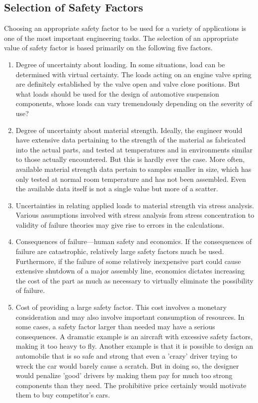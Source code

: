 \documentclass[a4paper,openany,12pt]{book}
\begin{document}
\subsection{Selection of Safety Factors}
\label{sec:org35afc56}
Choosing an appropriate safety factor to be used for a variety of
applications is one of the most important engineering tasks. The
selection of an appropriate value of safety factor is based primarily on
the following five factors.

\begin{enumerate}
\item Degree of uncertainty about loading. In some situations, load can be
determined with virtual certainty. The loads acting on an engine
valve spring are definitely established by the valve open and valve
close positions. But what loads should be used for the design of
automotive suspension components, whose loads can vary tremendously
depending on the severity of use?

\item Degree of uncertainty about material strength. Ideally, the engineer
would have extensive data pertaining to the strength of the material
as fabricated into the actual parts, and tested at temperatures and
in environments similar to those actually encountered. But this is
hardly ever the case. More often, available material strength data
pertain to samples smaller in size, which has only tested at normal
room temperature and has not been assembled. Even the available data
itself is not a single value but more of a scatter.

\item Uncertainties in relating applied loads to material strength via
stress analysis. Various assumptions involved with stress analysis
from stress concentration to validity of failure theories may give
rise to errors in the calculations.

\item Consequences of failure---human safety and economics. If the
consequences of failure are catastrophic, relatively large safety
factors much be used. Furthermore, if the failure of some relatively
inexpensive part could cause extensive shutdown of a major assembly
line, economics dictates increasing the cost of the part as much as
necessary to virtually eliminate the possibility of failure.

\item Cost of providing a large safety factor. This cost involves a
monetary consideration and may also involve important consumption of
resources. In some cases, a safety factor larger than needed may have
a serious consequences. A dramatic example is an aircraft with
excessive safety factors, making it too heavy to fly. Another example
is that it is possible to design an automobile that is so safe and
strong that even a 'crazy' driver trying to wreck the car would
barely cause a scratch. But in doing so, the designer would penalize
'good' drivers by making them pay for much too strong components than
they need. The prohibitive price certainly would motivate them to buy
competitor's cars.


\end{enumerate}
\end{document}
